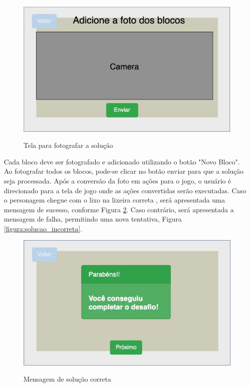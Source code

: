     \begin{figure}[H]
        \caption{Tela para fotografar a solução}
        \centering
        \includegraphics[width=\linewidth]{Imagens/Cap3/UploadSolucao.jpg}
        \label{figura:fotografar_blocos}
    \end{figure}
    
    Cada bloco deve ser fotografado e adicionado utilizando o botão "Novo Bloco".
    Ao fotografar todos os blocos, pode-se clicar no botão enviar para que a solução seja processada.
    Após a conversão da foto em ações para o jogo, o usuário é direcionado para a tela de jogo onde as ações convertidas serão executadas.
    Caso o personagem chegue com o lixo na lixeira correta , será apresentada uma mensagem de sucesso, conforme Figura \ref{figura:solucao_correta}. Caso contrário, será apresentada a mensagem de falha, permitindo uma nova tentativa, Figura \ref{figura:solucao_incorreta}.
    
    \begin{figure}[H]
        \caption{Mensagem de solução correta}
        \centering
        \includegraphics[width=\linewidth]{Imagens/Cap3/solucao_correta.jpg}
        \label{figura:solucao_correta}
    \end{figure}
    
